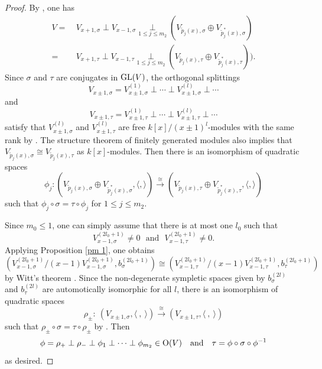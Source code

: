 \documentclass[12pt]{amsart}
\begin{document}
\begin{proof}  By \cite[Lemma 3.1]{Mil}, one has
$$ \begin{aligned} V =  \ & V_{x+1, \sigma} \perp V_{x-1, \sigma}  \underset{1\leq j\leq m_2} \perp (V_{\tilde{p}_ j(x), \sigma}\oplus V_{\tilde{p}_ j^*(x), \sigma}) \\
= \ & V_{x+1, \tau} \perp V_{x-1, \tau}  \underset{1\leq j\leq m_2} \perp (V_{\tilde{p}_ j(x), \tau}\oplus V_{\tilde{p}_ j^*(x), \tau})) . \end{aligned} $$
  Since $\sigma$ and $\tau$ are conjugates in ${\rm GL}(V)$, the orthogonal splittings 
$$ V_{x\pm1, \sigma} = V_{x\pm 1, \sigma }^{(1)} \perp \cdots \perp V_{x\pm 1, \sigma }^{(l)} \perp \cdots $$ and
$$ V_{x\pm1, \tau} = V_{x\pm 1, \tau}^{(1)} \perp \cdots \perp V_{x\pm 1, \tau}^{(l)} \perp \cdots $$
 satisfy that  $V_{x\pm 1, \sigma }^{(l)}$ and $V_{x\pm 1, \tau}^{(l)}$ are  free $k[x]/(x\pm 1)^l$-modules with the same rank by \cite[Theorem 3.2]{Mil}.  The structure theorem of finitely generated modules also implies that  $V_{\tilde{p}_j(x), \sigma}  \cong V_{\tilde{p}_j(x), \tau} $
as $k[x]$-modules.  Then there is 
an isomorphism of quadratic spaces
$$ \phi_j:  (V_{\tilde{p}_j(x), \sigma} \oplus V_{\tilde{p}_j^*(x), \sigma}, \langle, \rangle)  \xrightarrow{\cong}   (V_{\tilde{p}_j(x), \tau} \oplus V_{\tilde{p}_j^*(x), \tau}, \langle, \rangle) $$ such that $\phi_j \circ \sigma= \tau \circ \phi_j$ for $1\leq j\leq m_2$.

Since $m_0\leq 1$, one can simply assume that there is at most one $l_0$ such that $$V_{x-1, \sigma }^{(2l_0+1)} \neq 0 \ \ \ \text{and} \ \ \  V_{x-1, \tau}^{(2l_0+1)} \neq 0 . $$ 
Applying Proposition \ref{pm 1},  one obtains 
$$(V_{x-1, \sigma }^{(2l_0+1)}/ (x-1)V_{x-1, \sigma }^{(2l_0+1)}, b_\sigma^{(2l_0+1)}) \cong  (V_{x-1, \tau}^{(2l_0+1)}/(x-1)V_{x-1, \tau}^{(2l_0+1)}, b_\tau^{(2l_0+1)}) $$ by Witt's theorem \cite[42:16. Theorem]{OM}.  
Since the non-degenerate sympletic spaces given by $b_\sigma^{(2l)}$ and $b_\tau^{(2l)}$ are automotically isomorphic for all $l$, there is an isomorphism of quadratic spaces
$$ \rho_{\pm}  : \ (V_{x\pm 1, \sigma}, \langle \  , \  \rangle ) \xrightarrow{\cong} (V_{x\pm 1, \tau}, \langle \  , \  \rangle) $$
 such that $\rho_{\pm} \circ \sigma= \tau \circ \rho_{\pm}$ by \cite[Theorem 3.4]{Mil}. Then 
 $$ \phi=\rho_+\perp \rho_- \perp \phi_1\perp \cdots \perp \phi_{m_2} \in {\rm O}(V) \ \ \ \text{and} \ \ \ \tau=\phi \circ \sigma \circ \phi^{-1} $$ as desired.
\end{proof}
\end{document}
